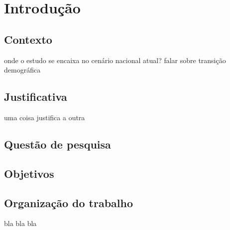 \chapter[Introdução]{Introdução}

\section{Contexto}
onde o estudo se encaixa no cenário nacional atual?
falar sobre transição demográfica
\section{Justificativa}
uma coisa justifica a outra
\section{Questão de pesquisa}

\section{Objetivos}

\section{Organização do trabalho}
bla bla bla
